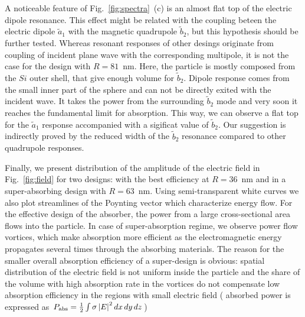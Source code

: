 \documentclass[aps,prl,twocolumn,showpacs,superscriptaddress,groupedaddress]{revtex4-1}
\begin{document}
A noticeable feature of Fig.~\ref{fig:spectra}~(c) is an almost flat
top of the electric dipole resonance.
This effect might be related with the coupling beteen the electric
dipole $\tilde{a}_1$ with the magnetic quadrupole $\tilde{b}_2$, but
this hypothesis should be further tested.  Whereas resonant responses
of other desings originate from coupling of incident plane wave with
the corresponding multipole, it is not the case for the design with
$R=81$~nm. Here, the particle is mostly composed from the $Si$ outer
shell, that give enough volume for $\tilde{b}_2$.  Dipole response
comes from the small inner part of the sphere and can not be directly
exited with the incident wave.  It takes the power from the
surrounding $\tilde{b}_2$ mode and very soon it reaches the
fundamental limit for absorption.  This way, we can observe a flat top
for the $\tilde{a}_1$ response accompanied with a sigificat value of
$\tilde{b}_2$.  Our suggestion is indirectly proved by the reduced
width of the $\tilde{b}_2$ resonance compared to other quadrupole
responses.

\begin{figure}
\end{figure}
Finally, we present distribution of the amplitude of the electric
field in Fig.~\ref{fig:field} for two designs: with the best
efficiency at $R=36$~nm and in a super-absorbing design with
$R=63$~nm.  Using semi-transparent white curves we also plot
streamlines of the Poynting vector which characterize energy flow.
For the effective design of the absorber, the power from a large
cross-sectional area flows into the particle.  In case of
super-absorption regime, we observe power flow vortices, which make
absorption more efficient as the electromagnetic energy propagates
several times through the absorbing materials.  The reason for the
smaller overall absorption efficiency of a super-design is obvious:
spatial distribution of the electric field is not uniform inside the
particle and the share of the volume with high absorption rate in the
vortices do not compensate low absorption efficiency in the regions
with small electric field ( absorbed power is expressed as $P_{\rm
  abs}=\frac{1}{2}\int\sigma \left|E\right|^2dx\,dy\,dz$)
\end{document}
